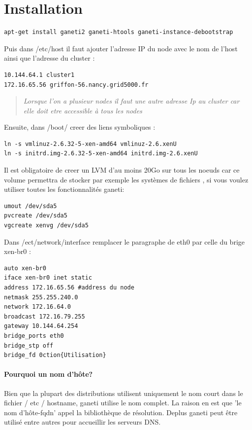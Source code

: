 \documentclass[a4paper,11pt]{report}
\begin{document}
      \section{Installation}
\begin{lstlisting}
apt-get install ganeti2 ganeti-htools ganeti-instance-debootstrap
\end{lstlisting}
Puis dans /etc/host il faut ajouter l'adresse IP du node avec le nom de l'host ainsi que l'adresse du cluster :\\
\begin{lstlisting}
10.144.64.1 cluster1
172.16.65.56 griffon-56.nancy.grid5000.fr
\end{lstlisting}
\begin{quotation}
\textit{Lorsque l'on a plusieur nodes il faut une autre adresse Ip au cluster car elle doit etre accessible à tous les nodes\\}
\end{quotation}
Ensuite, dans /boot/ creer des liens symboliques :
\begin{lstlisting}
ln -s vmlinuz-2.6.32-5-xen-amd64 vmlinuz-2.6.xenU
ln -s initrd.img-2.6.32-5-xen-amd64 initrd.img-2.6.xenU
\end{lstlisting}
Il est obligatoire de creer un LVM d'au moins 20Go sur tous les noeuds car ce volume permettra de stocker par exemple les systèmes de fichiers 
, si vous voulez utiliser toutes les fonctionnalités ganeti:\\
\begin{lstlisting}
umout /dev/sda5
pvcreate /dev/sda5
vgcreate xenvg /dev/sda5
\end{lstlisting}
Dans /ect/network/interface remplacer le paragraphe de eth0 par celle du brige xen-br0 :
\begin{lstlisting}
auto xen-br0
iface xen-br0 inet static
address 172.16.65.56 #address du node
netmask 255.255.240.0 
network 172.16.64.0
broadcast 172.16.79.255
gateway 10.144.64.254
bridge_ports eth0
bridge_stp off
bridge_fd 0ction{Utilisation}
\end{lstlisting}
\paragraph{\textbf{Pourquoi un nom d'hôte?} }
Bien que la plupart des distributions utilisent uniquement 
le nom court dans le fichier / etc / hostname, ganeti utilise le nom 
complet. La raison en est que 'le nom d'hôte-fqdn' appel la bibliothèque de résolution. Deplus ganeti peut être utilisé entre 
autres pour accueillir les serveurs DNS.
\end{document}
